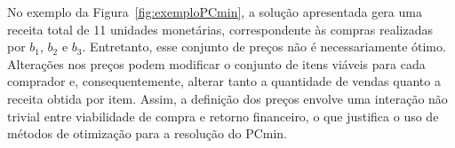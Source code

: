 No exemplo da Figura~\ref{fig:exemploPCmin}, a solução apresentada gera uma receita total de 11 unidades monetárias, correspondente às compras realizadas por $b_1$, $b_2$ e $b_3$. Entretanto, esse conjunto de preços não é necessariamente ótimo. Alterações nos preços podem modificar o conjunto de itens viáveis para cada comprador e, consequentemente, alterar tanto a quantidade de vendas quanto a receita obtida por item. Assim, a definição dos preços envolve uma interação não trivial entre viabilidade de compra e retorno financeiro, o que justifica o uso de métodos de otimização para a resolução do PCmin.




